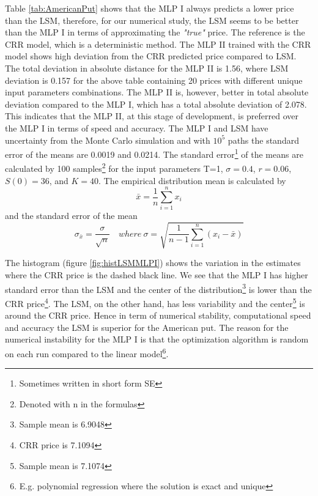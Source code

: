 Table \ref{tab:AmericanPut} shows that the MLP I always predicts a lower price than the LSM, therefore, for our numerical study, the LSM seems to be better than the MLP I in terms of approximating the \textsl{"true"} price. The reference is the CRR model, which is a deterministic method. The MLP II trained with the CRR model shows high deviation from the CRR predicted price compared to LSM. The total deviation in absolute distance for the MLP II is 1.56, where LSM deviation is 0.157 for the above table containing 20 prices with different unique input parameters combinations. The MLP II is, however, better in total absolute deviation compared to the MLP I, which has a total absolute deviation of 2.078. This indicates that the MLP II, at this stage of development, is preferred over the MLP I in terms of speed and accuracy. The MLP I and LSM have uncertainty from the Monte Carlo simulation and with $10^5$ paths the standard error of the means are 0.0019 and 0.0214. The standard error\footnote{Sometimes written in short form SE} of the means are calculated by 100 samples\footnote{Denoted with n in the formulas} for the input parameters T=1, $\sigma=0.4$, $r=0.06$, $S(0)=36$, and $K=40$. The empirical distribution mean is calculated by
$$\bar{x}= \frac{1}{n}\sum_{i=1}^{n} x_i$$
and the standard error of the mean
$$\sigma_{\bar{x}}= \frac{\sigma}{\sqrt{n}} \quad where \ \sigma=\sqrt{\frac{1}{n-1}\sum_{i=1}^{n} (x_i-\bar{x})}$$
 
The histogram (figure \ref{fig:histLSMMLPI}) shows the variation in the estimates where the CRR price is the dashed black line. We see that the MLP I has higher standard error than the LSM and the center of the distribution\footnote{Sample mean is 6.9048} is lower than the CRR price\footnote{CRR price is 7.1094}. The LSM, on the other hand, has less variability and the center\footnote{Sample mean is 7.1074} is around the CRR price. Hence in term of numerical stability, computational speed and accuracy the LSM is superior for the American put. The reason for the numerical instability for the MLP I is that the optimization algorithm is random on each run compared to the linear model\footnote{E.g. polynomial regression where the solution is exact and unique}.\\

